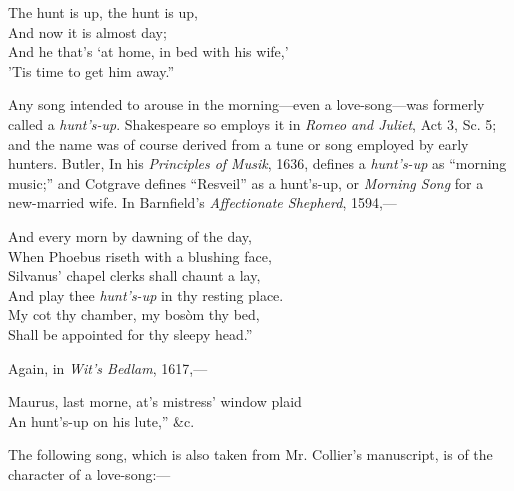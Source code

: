 \settowidth{\versewidth}{“The hunt is up, the hunt is up,}
\begin{scverse}\begin{altverse}
The hunt is up, the hunt is up,\\
And now it is almost day;\\
And he that’s ‘at home, in bed with his wife,’\\
’Tis time to get him away.”
\end{altverse}
\end{scverse}

Any song intended to arouse in the morning—even a love-song—was formerly
called a \textit{hunt’s-up}. Shakespeare so employs it in \textit{Romeo and Juliet}, Act 3, Sc. 5;
and the name was of course derived from a tune or song employed by early
hunters. Butler, In his \textit{Principles of Musik}, 1636, defines a \textit{hunt’s-up} as
“morning music;” and Cotgrave defines “Resveil” as a hunt’s-up, or \textit{Morning
Song} for a new-married wife. In Barnfield’s \textit{Affectionate Shepherd}, 1594,—

\settowidth{\versewidth}{“And every morn by dawning of the day,}
\begin{scverse}\begin{patverse}
And every morn by dawning of the day,\\
When Phoebus riseth with a blushing face,\\
Silvanus’ chapel clerks shall chaunt a lay,\\
And play thee \textit{hunt’s-up} in thy resting place.\\
My cot thy chamber, my bosòm thy bed,\\
Shall be appointed for thy sleepy head.”
\end{patverse}
\end{scverse}

Again, in \textit{Wit's Bedlam}, 1617,—

\begin{scverse}Maurus, last morne, at’s mistress’ window plaid\\
An hunt’s-up on his lute,” \&c.
\end{scverse}

The following song, which is also taken from Mr. Collier’s manuscript, is of
the character of a love-song:—
\vspace{-\baselineskip}

